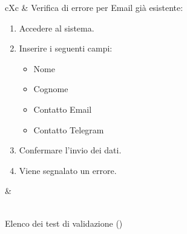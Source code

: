 \begin{table}[H]
\begin{VTtable}[1.7]{\textwidth}{cXc}
        \addtotv & Verifica di errore per Email già esistente:
		\begin{enumerate}
			\item Accedere al sistema.
            \item Inserire i seguenti campi:
                \begin{itemize}
                    \item Nome
                    \item Cognome
                    \item Contatto Email
                    \item Contatto Telegram
                \end{itemize}
            \item Confermare l'invio dei dati.
            \item Viene segnalato un errore.
		\end{enumerate}
		& \TNI \\
        \bottomrule\\
	\end{VTtable}
	\caption{Elenco dei test di validazione (\thetableCounter)}
\end{table}

